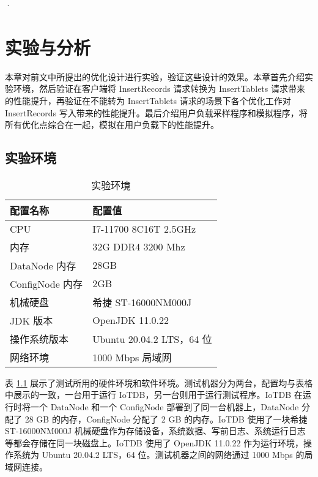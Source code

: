 ·%

\chapter{实验与分析\label{sec:chap8}}
本章对前文中所提出的优化设计进行实验，验证这些设计的效果。本章首先介绍实验环境，然后验证在客户端将 InsertRecords 请求转换为 InsertTablets 请求带来的性能提升，再验证在不能转为 InsertTablets 请求的场景下各个优化工作对 InsertRecords 写入带来的性能提升。最后介绍用户负载采样程序和模拟程序，将所有优化点综合在一起，模拟在用户负载下的性能提升。
\section{实验环境}
\begin{table}
  \centering
  \caption{实验环境}
  \begin{tabular}{ll}
    \toprule
    配置名称 & 配置值 \\
    \midrule 
    CPU & I7-11700 8C16T 2.5GHz\\
    内存 & 32G DDR4 3200 Mhz\\
    DataNode 内存 & 28GB \\
    ConfigNode 内存 & 2GB \\
    机械硬盘 & 希捷 ST-16000NM000J \\
    JDK 版本 & OpenJDK 11.0.22 \\
    操作系统版本 & Ubuntu 20.04.2 LTS，64 位 \\
    网络环境 & 1000 Mbps 局域网 \\
    \bottomrule
  \end{tabular}
  \label{tabular:iotdb-runtime-config}
\end{table}

表 \ref{tabular:iotdb-runtime-config} 展示了测试所用的硬件环境和软件环境。测试机器分为两台，配置均与表格中展示的一致，一台用于运行 IoTDB，另一台则用于运行测试程序。IoTDB 在运行时将一个 DataNode 和一个 ConfigNode 部署到了同一台机器上，DataNode 分配了 28 GB 的内存，ConfigNode 分配了 2 GB 的内存。IoTDB 使用了一块希捷 ST-16000NM000J 机械硬盘作为存储设备，系统数据、写前日志、系统运行日志等都会存储在同一块磁盘上。IoTDB 使用了 OpenJDK 11.0.22 作为运行环境，操作系统为 Ubuntu 20.04.2 LTS，64 位。测试机器之间的网络通过 1000 Mbps 的局域网连接。

